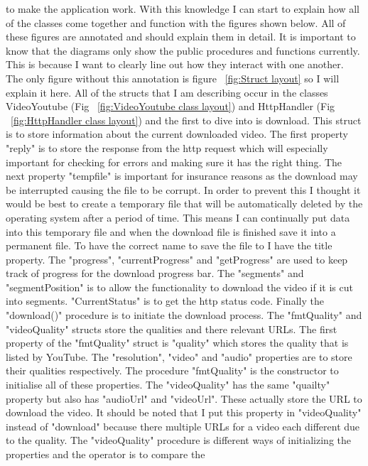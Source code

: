\documentclass{article}
\begin{document}
to make the application work.
With this knowledge I can start to explain how all of the classes come together and
function with the figures shown below. All of these figures are annotated and should
explain them in detail. It is important to know that the diagrams only show the
public procedures and functions currently. This is because I want to clearly line
out how they interact with one another. The only figure without this annotation is
figure ~\ref{fig:Struct layout} so I will explain it here. All of the structs that I
am describing occur in the classes VideoYoutube (Fig ~\ref{fig:VideoYoutube class layout})
and HttpHandler (Fig ~\ref{fig:HttpHandler class layout}) and the first to dive into is
download. This struct is to store information about the current downloaded video. The
first property "reply" is to store the response from the http request which will
especially important for checking for errors and making sure it has the right thing. The
next property "tempfile" is important for insurance reasons as the download may be
interrupted causing the file to be corrupt. In order to prevent this I thought it would
be best to create a temporary file that will be automatically deleted by the operating
system after a period of time. This means I can continually put data into this temporary
file and when the download file is finished save it into a permanent file. To have the
correct name to save the file to I have the title property. The "progress",
"currentProgress" and "getProgress" are used to keep track of progress for the download
progress bar. The "segments" and "segmentPosition" is to allow the functionality to
download the video if it is cut into segments. "CurrentStatus" is to get the http status
code. Finally the "download()" procedure is to initiate the download process.
The "fmtQuality" and "videoQuality" structs store the qualities and there relevant
URLs. The first property of the "fmtQuality" struct is "quality" which stores the quality
that is listed by YouTube. The "resolution", "video" and "audio" properties are to store
their qualities respectively. The procedure "fmtQuality" is the constructor to initialise
all of these properties. The "videoQuality" has the same "quailty" property but also has
"audioUrl" and "videoUrl". These actually store the URL to download the video. It should be
noted that I put this property in "videoQuality" instead of "download" because there
multiple URLs for a video each different due to the quality. The "videoQuality" procedure
is different ways of initializing the properties and the operator is to compare the
\end{document}
